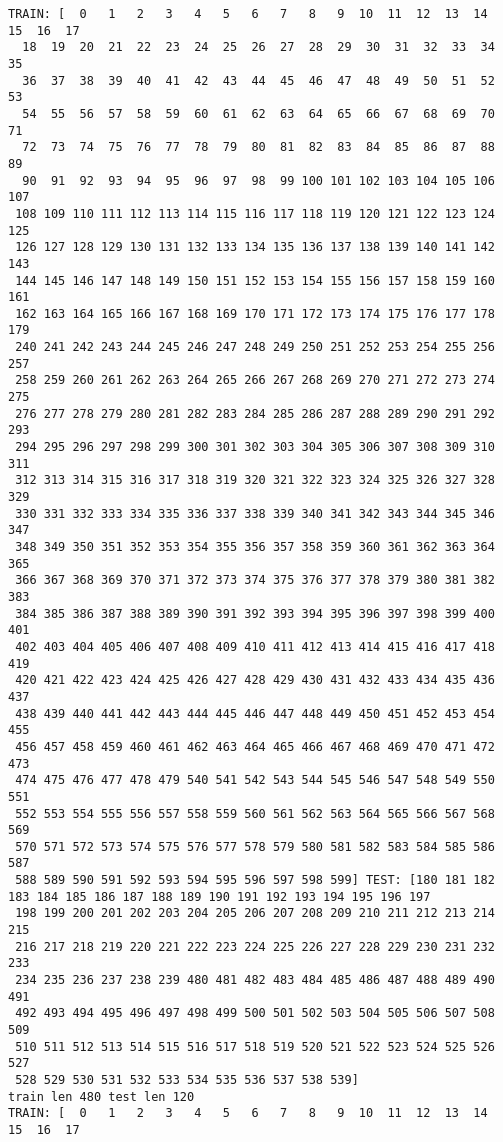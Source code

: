 \documentclass[11pt]{article}
\begin{document}
    \begin{Verbatim}[commandchars=\\\{\}]
TRAIN: [  0   1   2   3   4   5   6   7   8   9  10  11  12  13  14  15  16  17
  18  19  20  21  22  23  24  25  26  27  28  29  30  31  32  33  34  35
  36  37  38  39  40  41  42  43  44  45  46  47  48  49  50  51  52  53
  54  55  56  57  58  59  60  61  62  63  64  65  66  67  68  69  70  71
  72  73  74  75  76  77  78  79  80  81  82  83  84  85  86  87  88  89
  90  91  92  93  94  95  96  97  98  99 100 101 102 103 104 105 106 107
 108 109 110 111 112 113 114 115 116 117 118 119 120 121 122 123 124 125
 126 127 128 129 130 131 132 133 134 135 136 137 138 139 140 141 142 143
 144 145 146 147 148 149 150 151 152 153 154 155 156 157 158 159 160 161
 162 163 164 165 166 167 168 169 170 171 172 173 174 175 176 177 178 179
 240 241 242 243 244 245 246 247 248 249 250 251 252 253 254 255 256 257
 258 259 260 261 262 263 264 265 266 267 268 269 270 271 272 273 274 275
 276 277 278 279 280 281 282 283 284 285 286 287 288 289 290 291 292 293
 294 295 296 297 298 299 300 301 302 303 304 305 306 307 308 309 310 311
 312 313 314 315 316 317 318 319 320 321 322 323 324 325 326 327 328 329
 330 331 332 333 334 335 336 337 338 339 340 341 342 343 344 345 346 347
 348 349 350 351 352 353 354 355 356 357 358 359 360 361 362 363 364 365
 366 367 368 369 370 371 372 373 374 375 376 377 378 379 380 381 382 383
 384 385 386 387 388 389 390 391 392 393 394 395 396 397 398 399 400 401
 402 403 404 405 406 407 408 409 410 411 412 413 414 415 416 417 418 419
 420 421 422 423 424 425 426 427 428 429 430 431 432 433 434 435 436 437
 438 439 440 441 442 443 444 445 446 447 448 449 450 451 452 453 454 455
 456 457 458 459 460 461 462 463 464 465 466 467 468 469 470 471 472 473
 474 475 476 477 478 479 540 541 542 543 544 545 546 547 548 549 550 551
 552 553 554 555 556 557 558 559 560 561 562 563 564 565 566 567 568 569
 570 571 572 573 574 575 576 577 578 579 580 581 582 583 584 585 586 587
 588 589 590 591 592 593 594 595 596 597 598 599] TEST: [180 181 182 183 184 185 186 187 188 189 190 191 192 193 194 195 196 197
 198 199 200 201 202 203 204 205 206 207 208 209 210 211 212 213 214 215
 216 217 218 219 220 221 222 223 224 225 226 227 228 229 230 231 232 233
 234 235 236 237 238 239 480 481 482 483 484 485 486 487 488 489 490 491
 492 493 494 495 496 497 498 499 500 501 502 503 504 505 506 507 508 509
 510 511 512 513 514 515 516 517 518 519 520 521 522 523 524 525 526 527
 528 529 530 531 532 533 534 535 536 537 538 539]
train len 480 test len 120
TRAIN: [  0   1   2   3   4   5   6   7   8   9  10  11  12  13  14  15  16  17

\end{Verbatim}
\end{document}
